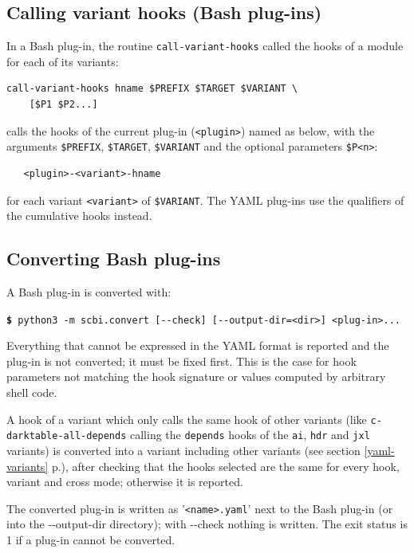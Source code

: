 \documentclass[a4paper,12pt,twoside]{article}
\newcommand{\code}[1]{\texttt{#1}}
\newcommand{\seeref}[1]{see section \ref{#1} p.\pageref{#1}}
\newcommand{\file}[1]{'{\texttt{#1}}'}
\newcommand{\cmd}[1]{\tabto{1cm}\hspace{0.5cm}\texttt{\textbf{\$} #1}}
\newcommand{\ddash}{-{}-}
\begin{document}
\subsection{Calling variant hooks (Bash plug-ins)}
\label{call variant hooks}

In a Bash plug-in, the routine \code{call-variant-hooks} called the hooks of a module for each of its variants:

\begin{lstlisting}
call-variant-hooks hname $PREFIX $TARGET $VARIANT \
    [$P1 $P2...]
\end{lstlisting}

calls the hooks of the current plug-in (\code{<plugin>}) named as below, with the arguments \code{\$PREFIX}, \code{\$TARGET}, \code{\$VARIANT} and the optional parameters \code{\$P<n>}:

\begin{lstlisting}
   <plugin>-<variant>-hname
\end{lstlisting}

for each variant \code{<variant>} of \code{\$VARIANT}. The YAML plug-ins
use the qualifiers of the cumulative hooks instead.

\subsection{Converting Bash plug-ins}
\label{bash-convert}

A Bash plug-in is converted with:

\cmd{python3 -m scbi.convert [\ddash{}check] [\ddash{}output-dir=<dir>] <plug-in>...}

Everything that cannot be expressed in the YAML format is reported and the
plug-in is not converted; it must be fixed first. This is the case for hook
parameters not matching the hook signature or values computed by arbitrary
shell code.

A hook of a variant which only calls the same hook of other variants (like
\code{c-darktable-all-depends} calling the \code{depends} hooks of the
\code{ai}, \code{hdr} and \code{jxl} variants) is converted into a
variant including other variants (\seeref{yaml-variants}), after checking
that the hooks selected are the same for every hook, variant and cross
mode; otherwise it is reported.

The converted plug-in is written as \file{<name>.yaml} next to the Bash
plug-in (or into the \ddash{}output-dir directory); with \ddash{}check
nothing is written. The exit status is 1 if a plug-in cannot be converted.
\end{document}
